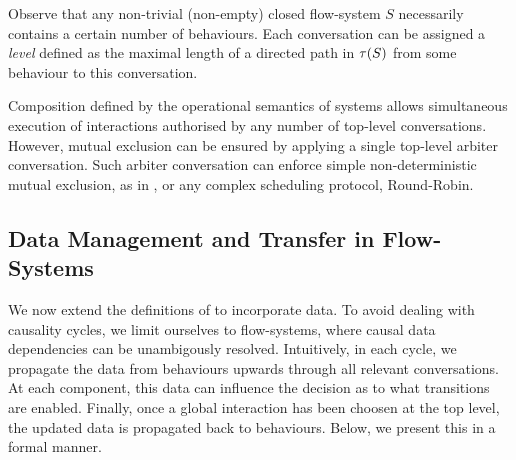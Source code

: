 Observe that any non-trivial (\ie non-empty) closed flow-system $S$
necessarily contains a certain number of behaviours.  Each conversation can
be assigned a \emph{level} defined as the maximal length of a directed path
in $\tau({S})$ from some behaviour to this conversation.

Composition defined by the operational semantics of systems allows
simultaneous execution of interactions authorised by any number of
top-level conversations.  However, mutual exclusion can be ensured by
applying a single top-level arbiter conversation.  Such arbiter
conversation can enforce simple non-deterministic mutual exclusion, as in
, or any complex scheduling protocol, \eg Round-Robin.


\subsection{Data Management and Transfer in Flow-Systems}
\label{sec:data}

We now extend the definitions of  to incorporate data.  To
avoid dealing with causality cycles, we limit ourselves to flow-systems,
where causal data dependencies can be unambigously resolved.  Intuitively,
in each cycle, we propagate the data from behaviours upwards through all
relevant conversations.  At each component, this data can influence the
decision as to what transitions are enabled.  Finally, once a global
interaction has been choosen at the top level, the updated data is
propagated back to behaviours.  Below, we present this in a formal manner.

